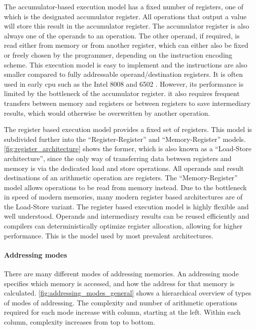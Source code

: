 The accumulator-based execution model has a fixed number of registers, one of which is the designated accumulator register. All operations that output a value will store this result in the accumulator register. The accumulator register is also always one of the operands to an operation. The other operand, if required, is read either from memory or from another register, which can either also be fixed or freely chosen by the programmer, depending on the instruction encoding scheme. This execution model is easy to implement and the instructions are also smaller compared to fully addressable operand/destination registers. It is often used in early \ac{cpu} such as the Intel 8008 and 6502 \cite{schlyter200513}. However, its performance is limited by the bottleneck of the accumulator register. it also requires frequent transfers between memory and registers or between registers to save intermediary results, which would otherwise be overwritten by another operation.

The register based execution model provides a fixed set of registers. This model is subdivided further into the ``Register-Register'' and ``Memory-Register'' models. \autoref{fig:register_architecture} shows the former, which is also known as a ``Load-Store architecture'', since the only way of transferring data between registers and memory is via the dedicated load and store operations. All operands and result destinations of an arithmetic operation are registers. The ``Memory-Register'' model allows operations to be read from memory instead. Due to the bottleneck in speed of modern memories, many modern register based architectures are of the Load-Store variant. The register based execution model is highly flexible and well understood. Operands and intermediary results can be reused efficiently and compilers can deterministically optimize register allocation, allowing for higher performance. This is the model used by most prevalent architectures.

\paragraph*{Addressing modes}

There are many different modes of addressing memories. An addressing mode specifies which memory is accessed, and how the address for that memory is calculated. \autoref{fig:addressing_modes_general} shows a hierarchical overview of types of modes of addressing. The complexity and number of arithmetic operations required for each mode increase with column, starting at the left. Within each column, complexity increases from top to bottom.

